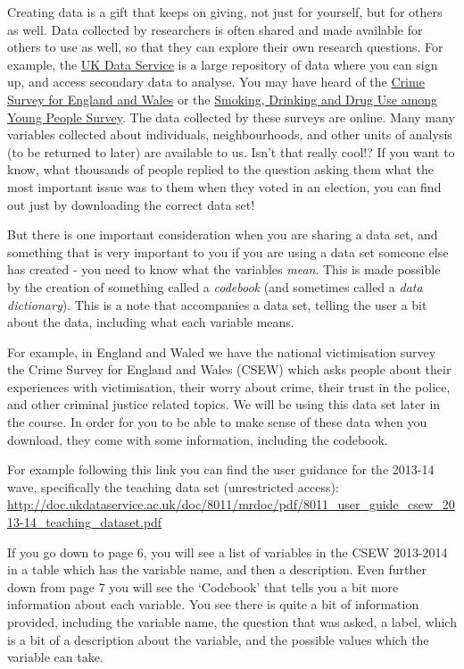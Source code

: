 \documentclass[
]{book}
\begin{document}
Creating data is a gift that keeps on giving, not just for yourself, but for others as well. Data collected by researchers is often shared and made available for others to use as well, so that they can explore their own research questions. For example, the \href{https://www.ukdataservice.ac.uk/}{UK Data Service} is a large repository of data where you can sign up, and access secondary data to analyse. You may have heard of the \href{http://www.crimesurvey.co.uk/}{Crime Survey for England and Wales} or the \href{http://content.digital.nhs.uk/catalogue/PUB17879}{Smoking, Drinking and Drug Use among Young People Survey}. The data collected by these surveys are online. Many many variables collected about individuals, neighbourhoods, and other units of analysis (to be returned to later) are available to us. Isn't that really cool!? If you want to know, what thousands of people replied to the question asking them what the most important issue was to them when they voted in an election, you can find out just by downloading the correct data set!

But there is one important consideration when you are sharing a data set, and something that is very important to you if you are using a data set someone else has created - you need to know what the variables \emph{mean}. This is made possible by the creation of something called a \emph{codebook} (and sometimes called a \emph{data dictionary}). This is a note that accompanies a data set, telling the user a bit about the data, including what each variable means.

For example, in England and Waled we have the national victimisation survey the Crime Survey for England and Wales (CSEW) which asks people about their experiences with victimisation, their worry about crime, their trust in the police, and other criminal justice related topics. We will be using this data set later in the course. In order for you to be able to make sense of these data when you download, they come with some information, including the codebook.

For example following this link you can find the user guidance for the 2013-14 wave, specifically the teaching data set (unrestricted access): \url{http://doc.ukdataservice.ac.uk/doc/8011/mrdoc/pdf/8011_user_guide_csew_2013-14_teaching_dataset.pdf}

If you go down to page 6, you will see a list of variables in the CSEW 2013-2014 in a table which has the variable name, and then a description. Even further down from page 7 you will see the `Codebook' that tells you a bit more information about each variable. You see there is quite a bit of information provided, including the variable name, the question that was asked, a label, which is a bit of a description about the variable, and the possible values which the variable can take.
\end{document}
